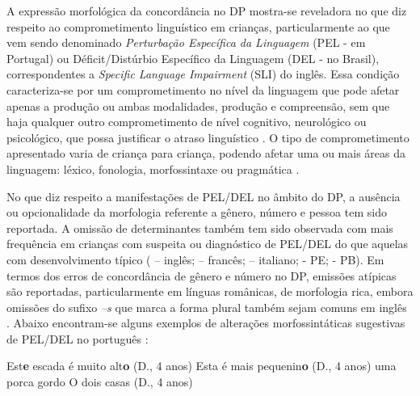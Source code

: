 \documentclass[output=paper]{LSP/langsci}
\begin{document}
A expressão morfológica da concordância no DP mostra-se reveladora no que diz respeito ao comprometimento linguístico em crianças, particularmente ao que vem sendo denominado \textit{Perturbação Específica da Linguagem} (PEL - em Portugal) ou Déficit/Distúrbio Específico da Linguagem (DEL - no Brasil), correspondentes a \textit{Specific Language Impairment} (SLI) do inglês. Essa condição caracteriza-se por um comprometimento no nível da linguagem que pode afetar apenas a produção ou ambas modalidades, produção e compreensão, sem que haja qualquer outro comprometimento de nível cognitivo, neurológico ou psicológico, que possa justificar o atraso linguístico \citep{leonard1995}. O tipo de comprometimento apresentado varia de criança para criança, podendo afetar uma ou mais áreas da linguagem: léxico, fonologia, morfossintaxe ou pragmática \citep{friedmannnovogrodsky2008}.

No que diz respeito a manifestações de PEL/DEL no âmbito do DP, a ausência ou  opcionalidade da morfologia referente a gênero, número e pessoa tem sido reportada. A omissão de determinantes também tem sido observada com mais frequência em crianças com suspeita ou diagnóstico de PEL/DEL do que aquelas com desenvolvimento típico (\citealt{leonard1995} – inglês; \citealt{roulet2007} – francês; \citealt{bortolini_etal1997} – italiano; \citealt{branco_etal2011} - PE; \citealt{silveira2002,silveira2006} - PB). Em termos dos erros de concordância de gênero e número no DP, emissões atípicas são reportadas, particularmente em línguas românicas, de morfologia rica, embora omissões do sufixo \textit{–s} que marca a forma plural também sejam comuns em inglês \citep{leonard1995}. Abaixo encontram-se alguns exemplos de alterações morfossintáticas sugestivas de PEL/DEL no português \citep{castrogomes2000,haeusler2005}:

\ea\label{ex:correanp_20} Est\textbf{e} escada é muito alt\textbf{o} (D., 4 anos)\z
\ea\label{ex:correanp_21} Esta é mais pequenin\textbf{o} (D., 4 anos)\z
\ea\label{ex:correanp_22} uma porca gordo\z
\ea\label{ex:correanp_23} O dois casas (D., 4 anos)\z
\end{document}
